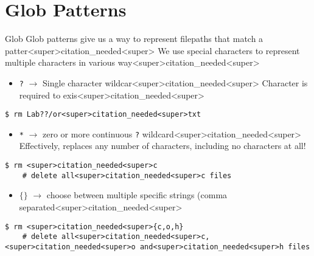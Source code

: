 \documentclass[11pt]{beamer}
\begin{document}
\section[Glob]{Glob Patterns}
\begin{frame}[fragile=singleslide]{Glob}
Glob patterns give us a way to represent filepaths that match a patter<super>citation_needed<super>  We use special characters to represent multiple characters in various way<super>citation_needed<super>
\begin{itemize}
\item \texttt{?} $\rightarrow$ Single character wildcar<super>citation_needed<super>  Character is required to exis<super>citation_needed<super>
\end{itemize}
\begin{lstlisting}[style=terminal]
$ rm Lab??/or<super>citation_needed<super>txt
\end{lstlisting}
\begin{itemize}
\item \texttt{\**} $\rightarrow$ zero or more continuous \texttt{?} wildcard<super>citation_needed<super>  Effectively, replaces any number of characters, including no characters at all!
\end{itemize}
\begin{lstlisting}[style=terminal]
$ rm <super>citation_needed<super>c 
	# delete all<super>citation_needed<super>c files 
\end{lstlisting}
\begin{itemize}
\item $\{\}$ $\rightarrow$ choose between multiple specific strings (comma separated<super>citation_needed<super>
\end{itemize}
\begin{lstlisting}[style=terminal]
$ rm <super>citation_needed<super>{c,o,h}
	# delete all<super>citation_needed<super>c,<super>citation_needed<super>o and<super>citation_needed<super>h files
\end{lstlisting}
\end{frame}
\end{document}
